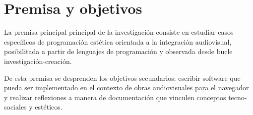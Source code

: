 \section*{Premisa y objetivos}


La premisa principal principal de la investigación consiste en estudiar casos específicos de programación estética orientada a la integración audiovisual, posibilitada a partir de lenguajes de programación y observada desde bucle investigación-creación. 

De esta premisa se desprenden los objetivos secundarios: escribir software que pueda ser implementado en el contexto de obras audiovisuales para el navegador y realizar reflexiones a manera de documentación que vinculen conceptos tecno-sociales y estéticos. 

